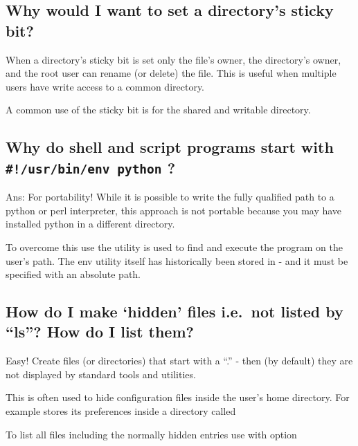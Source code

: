 \subsection{Why would I want to set a directory's sticky bit?}\label{why-would-i-want-to-set-a-directorys-sticky-bit}

When a directory's sticky bit is set only the file's owner, the directory's owner, and the root user can rename (or delete) the file. This is useful when multiple users have write access to a common directory.

A common use of the sticky bit is for the shared and writable  directory.

\subsection{\texorpdfstring{Why do shell and script programs start with \texttt{\#!/usr/bin/env\ python} ?}{Why do shell and script programs start with \#!/usr/bin/env python ?}}\label{why-do-shell-and-script-programs-start-with-usrbinenv-python}

Ans: For portability! While it is possible to write the fully qualified path to a python or perl interpreter, this approach is not portable because you may have installed python in a different directory.

To overcome this use the  utility is used to find and execute the program on the user's path. The env utility itself has historically been stored in  - and it must be specified with an absolute path.

\subsection{\texorpdfstring{How do I make `hidden' files i.e.~not listed by ``ls''? How do I list them?}{How do I make hidden files i.e.~not listed by ls? How do I list them?}}\label{how-do-i-make-hidden-files-i.e.not-listed-by-ls-how-do-i-list-them}

Easy! Create files (or directories) that start with a ``.'' - then (by default) they are not displayed by standard tools and utilities.

This is often used to hide configuration files inside the user's home directory. For example  stores its preferences inside a directory called 

To list all files including the normally hidden entries use  with  option

